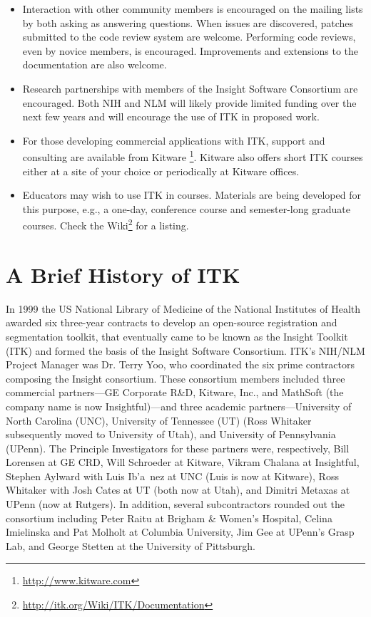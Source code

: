 \begin{itemize}
       \item Interaction with other community members is encouraged on the
       mailing lists by both asking as answering questions. When issues are
       discovered, patches submitted to the code review system are welcome.
       Performing code reviews, even by novice members, is encouraged.
       Improvements and extensions to the documentation are also welcome.

       \item Research partnerships with members of the Insight Software
       Consortium are encouraged. Both NIH and NLM will likely provide
       limited funding over the next few years and will encourage the use of
       ITK in proposed work.

       \item For those developing commercial applications with ITK, support
       and consulting are available from Kitware \footnote{\url{http://www.kitware.com}}.
       Kitware also offers short ITK courses either at a site of your choice
       or periodically at Kitware offices.

       \item Educators may wish to use ITK in courses. Materials are being
       developed for this purpose, e.g., a one-day, conference course and
       semester-long graduate courses. Check the
       Wiki\footnote{\url{http://itk.org/Wiki/ITK/Documentation}} for a listing.
\end{itemize}

\section{A Brief History of ITK}
\label{sec:History}

In 1999 the US National Library of Medicine of the National Institutes of
Health awarded six three-year contracts to develop an open-source
registration and segmentation toolkit, that eventually came to be known as
the Insight Toolkit (ITK) and formed the basis of the Insight Software
Consortium. ITK's NIH/NLM Project Manager was Dr. Terry Yoo, who coordinated the
six prime contractors composing the Insight consortium. These consortium
members included three commercial partners---GE Corporate R\&D, Kitware,
Inc., and MathSoft (the company name is now Insightful)---and three academic
partners---University of North Carolina (UNC), University of Tennessee (UT)
(Ross Whitaker subsequently moved to University of Utah), and University of
Pennsylvania (UPenn). The Principle Investigators for these partners were,
respectively, Bill Lorensen at GE CRD, Will Schroeder at Kitware, Vikram
Chalana at Insightful, Stephen Aylward with Luis Ib'{a}~{n}ez at UNC (Luis is now
at Kitware), Ross Whitaker with Josh Cates at UT (both now at Utah), and
Dimitri Metaxas at UPenn (now at Rutgers). In addition, several
subcontractors rounded out the consortium including Peter Raitu at Brigham \&
Women's Hospital, Celina Imielinska and Pat Molholt at Columbia University,
Jim Gee at UPenn's Grasp Lab, and George Stetten at the University of
Pittsburgh.

